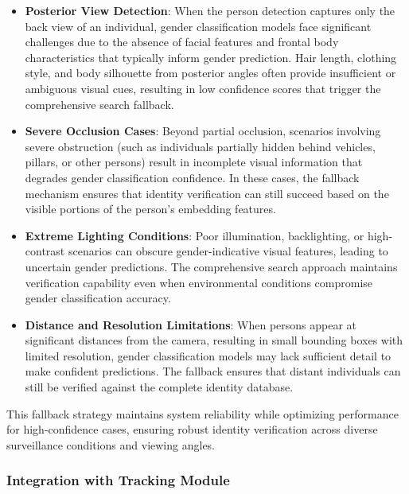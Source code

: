 \begin{itemize}
    \item \textbf{Posterior View Detection}: When the person detection captures only the back view of an individual, gender classification models face significant challenges due to the absence of facial features and frontal body characteristics that typically inform gender prediction. Hair length, clothing style, and body silhouette from posterior angles often provide insufficient or ambiguous visual cues, resulting in low confidence scores that trigger the comprehensive search fallback.

    \item \textbf{Severe Occlusion Cases}: Beyond partial occlusion, scenarios involving severe obstruction (such as individuals partially hidden behind vehicles, pillars, or other persons) result in incomplete visual information that degrades gender classification confidence. In these cases, the fallback mechanism ensures that identity verification can still succeed based on the visible portions of the person's embedding features.

    \item \textbf{Extreme Lighting Conditions}: Poor illumination, backlighting, or high-contrast scenarios can obscure gender-indicative visual features, leading to uncertain gender predictions. The comprehensive search approach maintains verification capability even when environmental conditions compromise gender classification accuracy.

    \item \textbf{Distance and Resolution Limitations}: When persons appear at significant distances from the camera, resulting in small bounding boxes with limited resolution, gender classification models may lack sufficient detail to make confident predictions. The fallback ensures that distant individuals can still be verified against the complete identity database.
    
\end{itemize}

This fallback strategy maintains system reliability while optimizing performance for high-confidence cases, ensuring robust identity verification across diverse surveillance conditions and viewing angles.

\subsubsection{Integration with Tracking Module}

